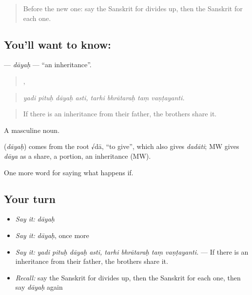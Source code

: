 \label{lesson:SA-C550-dayah}



\begin{quote}
Before the new one: say the Sanskrit for divides up, then the Sanskrit for each one.
\end{quote}

\subsection*{You'll want to know: }
\textbf{} — \emph{dāyaḥ} — \textquotedblleft{}an inheritance\textquotedblright{}.

\begin{quote}
   ,    
\end{quote}

\begin{quote}
\emph{yadi pituḥ dāyaḥ asti, tarhi bhrātaraḥ taṃ vaṇṭayanti.}
\end{quote}

\begin{quote}
If there is an inheritance from their father, the brothers share it.
\end{quote}

A masculine noun.

\begin{cousinweb}
\textbf{} (\emph{dāyaḥ}) comes from the root √dā, \textquotedblleft{}to give\textquotedblright{}, which also gives \emph{dadāti}; MW gives \emph{dāya} as a share, a portion, an inheritance (MW).
\end{cousinweb}

\begin{grammarlens}[title={What you've built}]
One more word for saying what happens if.
\end{grammarlens}

\subsection*{Your turn}
\begin{itemize}
\raggedright
  \item \emph{Say it:} \emph{dāyaḥ}
  \item \emph{Say it:} \emph{dāyaḥ}, once more
  \item \emph{Say it:} \emph{yadi pituḥ dāyaḥ asti, tarhi bhrātaraḥ taṃ vaṇṭayanti.} — If there is an inheritance from their father, the brothers share it.
  \item \emph{Recall:} say the Sanskrit for divides up, then the Sanskrit for each one, then say \emph{dāyaḥ} again
\end{itemize}

